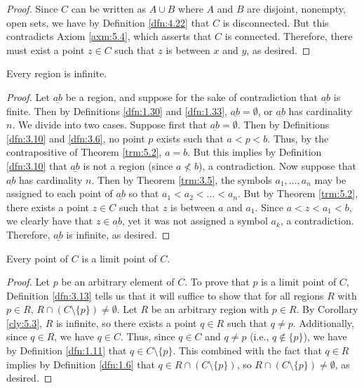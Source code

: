\documentclass[../main.tex]{subfiles}
\begin{document}
\begin{theorem}
\begin{proof}
        Since $C$ can be written as $A\cup B$ where $A$ and $B$ are disjoint, nonempty, open sets, we have by Definition \ref{dfn:4.22} that $C$ is disconnected. But this contradicts Axiom \ref{axm:5.4}, which asserts that $C$ is connected. Therefore, there must exist a point $z\in C$ such that $z$ is between $x$ and $y$, as desired.
    \end{proof}
\end{theorem}

\begin{corollary}\label{cly:5.3}
    Every region is infinite.
    \begin{proof}
        Let $\underline{ab}$ be a region, and suppose for the sake of contradiction that $\underline{ab}$ is finite. Then by Definitions \ref{dfn:1.30} and \ref{dfn:1.33}, $\underline{ab}=\emptyset$, or $\underline{ab}$ has cardinality $n$. We divide into two cases. Suppose first that $\underline{ab}=\emptyset$. Then by Definitions \ref{dfn:3.10} and \ref{dfn:3.6}, no point $p$ exists such that $a<p<b$. Thus, by the contrapositive of Theorem \ref{trm:5.2}, $a=b$. But this implies by Definition \ref{dfn:3.10} that $\underline{ab}$ is not a region (since $a\not<b$), a contradiction. Now suppose that $\underline{ab}$ has cardinality $n$. Then by Theorem \ref{trm:3.5}, the symbols $a_1,\dots,a_n$ may be assigned to each point of $\underline{ab}$ so that $a_1<a_2<\dots<a_n$. But by Theorem \ref{trm:5.2}, there exists a point $z\in C$ such that $z$ is between $a$ and $a_1$. Since $a<z<a_1<b$, we clearly have that $z\in\underline{ab}$, yet it was not assigned a symbol $a_k$, a contradiction. Therefore, $\underline{ab}$ is infinite, as desired.
    \end{proof}
\end{corollary}

\begin{corollary}\label{cly:5.4}
    Every point of $C$ is a limit point of $C$.
    \begin{proof}
        Let $p$ be an arbitrary element of $C$. To prove that $p$ is a limit point of $C$, Definition \ref{dfn:3.13} tells us that it will suffice to show that for all regions $R$ with $p\in R$, $R\cap(C\setminus\{p\})\neq\emptyset$. Let $R$ be an arbitrary region with $p\in R$. By Corollary \ref{cly:5.3}, $R$ is infinite, so there exists a point $q\in R$ such that $q\neq p$. Additionally, since $q\in R$, we have $q\in C$. Thus, since $q\in C$ and $q\neq p$ (i.e., $q\notin\{p\}$), we have by Definition \ref{dfn:1.11} that $q\in C\setminus\{p\}$. This combined with the fact that $q\in R$ implies by Definition \ref{dfn:1.6} that $q\in R\cap(C\setminus\{p\})$, so $R\cap(C\setminus\{p\})\neq\emptyset$, as desired.
    \end{proof}
\end{corollary}
\end{document}
